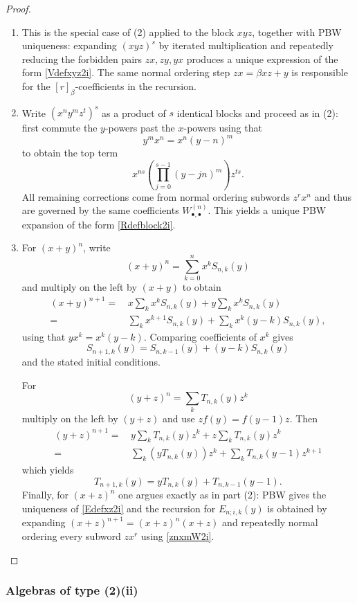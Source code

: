 \documentclass{amsart}
\theoremstyle{definition}
\theoremstyle{remark}
\numberwithin{equation}{section}
\begin{document}
\begin{proof}
\begin{enumerate}
\item [\rm (3)] This is the special case of (2) applied to the block $xyz$, together with PBW uniqueness: expanding $(xyz)^s$ by iterated multiplication and repeatedly reducing the forbidden pairs
$zx,zy,yx$ produces a unique expression of the form \eqref{Vdefxyz2i}. The same normal ordering step $zx=\beta xz+y$ is responsible for the $[r]_{\beta}$-coefficients in the recursion.

\item [\rm (4)] Write $(x^n y^m z^t)^s$ as a product of $s$ identical blocks and proceed as in (2): first commute the $y$-powers past the $x$-powers using that
$$
y^m x^n=x^n(y-n)^m
$$
to obtain the top term 
$$
x^{ns}\left(\prod_{j=0}^{s-1}(y-jn)^m\right)z^{ts}.
$$
All remaining corrections come from normal ordering subwords $z^r x^n$ and thus are governed by the same coefficients $W^{(n)}_{\bullet,\bullet}$. This yields a unique PBW expansion of the form \eqref{Rdefblock2i}.

\item [\rm (5)] For $(x+y)^n$, write 
$$
(x+y)^n = \sum_{k=0}^n x^k S_{n,k}(y)
$$ 
and multiply on the left by $(x+y)$ to obtain
\begin{align*}
 (x+y)^{n+1} = &\, x\sum_{k}x^k S_{n,k}(y)+y\sum_{k}x^k S_{n,k}(y) \\
 = &\, \sum_{k}x^{k+1}S_{n,k}(y)+\sum_{k}x^k (y-k)S_{n,k}(y),
\end{align*}
using that $y x^k = x^k(y-k)$. Comparing coefficients of $x^k$ gives
$$
S_{n+1,k}(y) = S_{n,k-1}(y)+(y-k)S_{n,k}(y)
$$
and the stated initial conditions.

For 
$$
(y+z)^n = \sum_k T_{n,k}(y)z^k
$$
multiply on the left by $(y+z)$ and use $z f(y) = f(y-1)z$. Then
\begin{align*}
(y+z)^{n+1} = &\, y\sum_k T_{n,k}(y)z^k+z\sum_k T_{n,k}(y)z^k \\
= &\, \sum_k (yT_{n,k}(y))z^k+\sum_k T_{n,k}(y-1)z^{k+1}
\end{align*}
which yields 
$$
T_{n+1,k}(y) = yT_{n,k}(y)+T_{n,k-1}(y-1).
$$
Finally, for $(x+z)^n$ one argues exactly as in part (2): PBW gives the uniqueness of \eqref{Edefxz2i} and the recursion for $E_{n;i,k}(y)$ is obtained by expanding $(x+z)^{n+1}=(x+z)^n(x+z)$ and repeatedly normal ordering every subword $zx^r$ using \eqref{znxmW2i}.
\end{enumerate}
\end{proof}


\subsubsection{Algebras of type (2)(ii)}
\end{document}
